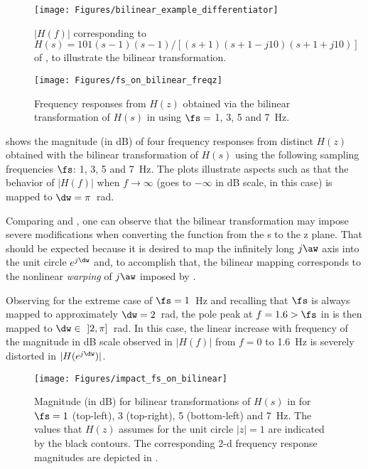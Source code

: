 \begin{figure}[htbp]
\centering
\texttt{[image: Figures/bilinear\_example\_differentiator]}
\caption{$|H(f)|$ corresponding to $H(s)=101(s-1)(s-1)/[(s+1)(s+1-j10)(s+1+j10)]$ of , to illustrate the bilinear transformation.\label{fig:bilinear_example_differentiator}}
\end{figure}

\begin{figure}[htbp]
\centering
\texttt{[image: Figures/fs\_on\_bilinear\_freqz]}
\caption{Frequency responses from $H(z)$ obtained via the bilinear transformation of $H(s)$ in  using $\fs=$ 1, 3, 5 and 7~Hz.\label{fig:fs_on_bilinear_freqz}}
\end{figure}

 shows the magnitude (in dB) of four frequency responses
from distinct $H(z)$ obtained with the bilinear transformation of $H(s)$ using the following sampling frequencies $\fs$: 1, 3, 5 and 7~Hz. The plots illustrate aspects such as that the behavior
of $|H(f)|$ when $f \rightarrow \infty$ (goes to $- \infty$ in dB scale, in this case) is mapped to $\dw=\pi$~rad.

Comparing  and , one can observe that the bilinear transformation may impose severe modifications when converting the function from the s to the z plane. That should be expected because it is desired to map the infinitely long $j \aw$ axis into the unit circle $e^{j \dw}$ and, to accomplish that, 
the bilinear mapping 
corresponds to the nonlinear \emph{warping} of $j \aw$ imposed by . 

Observing  for the extreme case of $\fs=1$~Hz and recalling
that $\fs$ is always mapped
to approximately $\dw=2$~rad, the pole peak at $f=1.6 > \fs$ in  
is then mapped to $\dw \in \textrm{~} ]2, \pi]$~rad. In this case, the linear increase
with frequency
of the magnitude in dB scale observed in $|H(f)|$ from $f=0$ to 1.6~Hz is severely distorted in $|H(e^{j\dw})|$.


\begin{figure}[htbp]
\centering
\texttt{[image: Figures/impact\_fs\_on\_bilinear]}
\caption[{Magnitude (in dB) for bilinear transformations of $H(s)$.}]{Magnitude (in dB) for bilinear transformations of $H(s)$ in  for $\fs=1$  (top-left), 3 (top-right), 5 (bottom-left) and 7~Hz. The values that $H(z)$ assumes for the unit circle $|z|=1$ are indicated by the black contours. The corresponding 2-d frequency response magnitudes are depicted in .\label{fig:impact_fs_on_bilinear}}
\end{figure}


